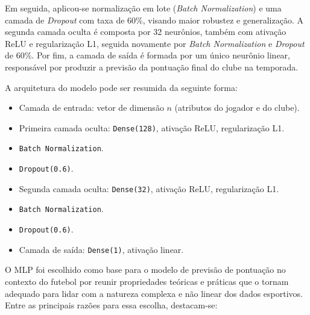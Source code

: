 Em seguida, aplicou-se normalização em lote (\textit{Batch Normalization}) e uma camada de \textit{Dropout} com taxa de 60\%, visando maior robustez e generalização. 
A segunda camada oculta é composta por 32 neurônios, também com ativação ReLU e regularização L1, seguida novamente por \textit{Batch Normalization} e \textit{Dropout} 
de 60\%. Por fim, a camada de saída é formada por um único neurônio linear, responsável por produzir a previsão da pontuação final do clube na temporada.

A arquitetura do modelo pode ser resumida da seguinte forma:

\begin{itemize}
    \item Camada de entrada: vetor de dimensão $n$ (atributos do jogador e do clube).
    \item Primeira camada oculta: \texttt{Dense(128)}, ativação ReLU, regularização L1.
    \item \texttt{Batch Normalization}.
    \item \texttt{Dropout(0.6)}.
    \item Segunda camada oculta: \texttt{Dense(32)}, ativação ReLU, regularização L1.
    \item \texttt{Batch Normalization}.
    \item \texttt{Dropout(0.6)}.
    \item Camada de saída: \texttt{Dense(1)}, ativação linear.
\end{itemize}
O MLP foi escolhido como base para o modelo de previsão de pontuação no contexto do futebol por reunir propriedades teóricas e práticas que o tornam adequado para 
lidar com a natureza complexa e não linear dos dados esportivos. Entre as principais razões para essa escolha, destacam-se:

